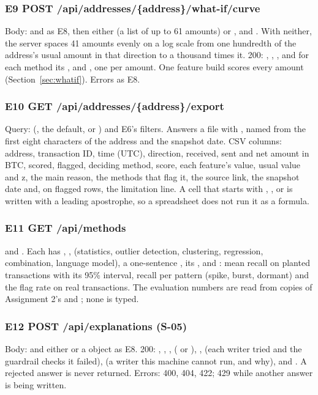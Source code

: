 \subsubsection*{E9 \quad POST /api/addresses/\{address\}/what-if/curve}
Body:  and  as E8, then either  (a list of up to 61
amounts) or ,  and . With neither, the server spaces 41
amounts evenly on a log scale from one hundredth of the address's usual amount in that direction to
a thousand times it. 200: , , , and for each
method its ,  and , one per amount. One feature build
scores every amount (Section~\ref{sec:whatif}). Errors as E8.

\subsubsection*{E10 \quad GET /api/addresses/\{address\}/export}
Query:  (, the default, or ) and E6's filters. Answers a file
with , named from the first eight characters of the address
and the snapshot date. CSV columns: address, transaction ID, time (UTC), direction, received, sent
and net amount in BTC, scored, flagged, deciding method, score, each feature's value, usual value
and z, the main reason, the methods that flag it, the source link, the snapshot date and, on
flagged rows, the limitation line. A cell that starts with \code{=}, \code{+}, \code{-} or
 is written with a leading apostrophe, so a spreadsheet does not run it as a formula.

\subsubsection*{E11 \quad GET /api/methods}
 and . Each has , ,  (statistics,
outlier detection, clustering, regression, combination, language model), a one-sentence
, its ,  and : mean recall
on planted transactions with its 95\% interval, recall per pattern (spike, burst, dormant) and the
flag rate on real transactions. The evaluation numbers are read from copies of Assignment 2's
 and ; none is typed.

\subsubsection*{E12 \quad POST /api/explanations \quad (S-05)}
Body:  and either  or a  object as E8. 200: ,
, ,  ( or ),
,  (each writer tried and the guardrail checks it failed),
 (a writer this machine cannot run, and why),  and
. A rejected answer is never returned. Errors: 400, 404, 422; 429 while another
answer is being written.

